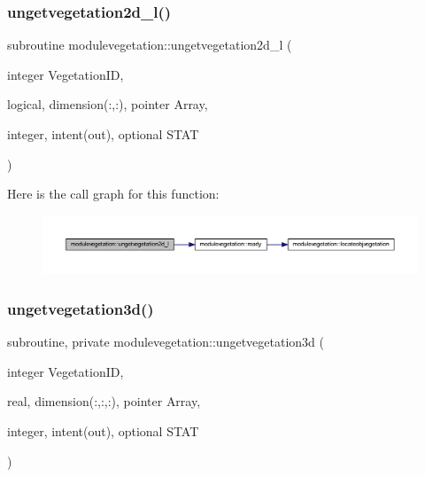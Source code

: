 \subsubsection{\texorpdfstring{ungetvegetation2d\+\_\+l()}{ungetvegetation2d\_l()}}
{\footnotesize\ttfamily subroutine modulevegetation\+::ungetvegetation2d\+\_\+l (\begin{DoxyParamCaption}\item[{integer}]{Vegetation\+ID,  }\item[{logical, dimension(\+:,\+:), pointer}]{Array,  }\item[{integer, intent(out), optional}]{S\+T\+AT }\end{DoxyParamCaption})\hspace{0.3cm}{\ttfamily [private]}}

Here is the call graph for this function\+:\nopagebreak
\begin{figure}[H]
\begin{center}
\leavevmode
\includegraphics[width=350pt]{namespacemodulevegetation_ae3b94dadad52bcad92f73e4358946cda_cgraph}
\end{center}
\end{figure}
\mbox{\label{namespacemodulevegetation_a1908216b2236c50cd95129a3757c0ebd}} 
\subsubsection{\texorpdfstring{ungetvegetation3d()}{ungetvegetation3d()}}
{\footnotesize\ttfamily subroutine, private modulevegetation\+::ungetvegetation3d (\begin{DoxyParamCaption}\item[{integer}]{Vegetation\+ID,  }\item[{real, dimension(\+:,\+:,\+:), pointer}]{Array,  }\item[{integer, intent(out), optional}]{S\+T\+AT }\end{DoxyParamCaption})\hspace{0.3cm}{\ttfamily [private]}}

